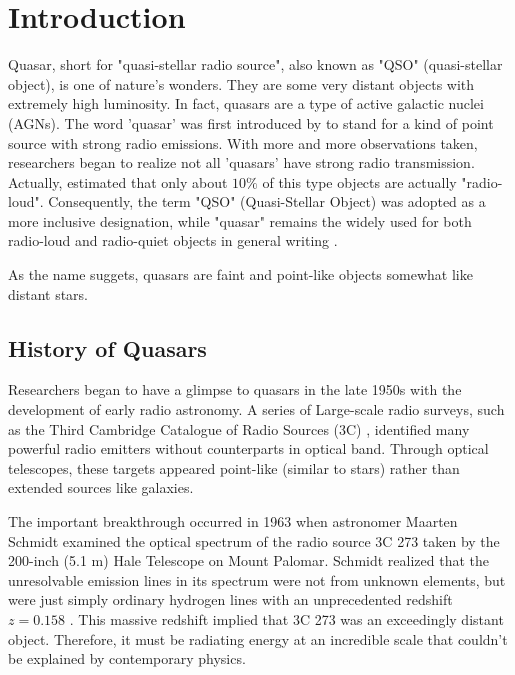 \chapter{Introduction}

Quasar, short for "quasi-stellar radio source", also known as "QSO" (quasi-stellar object), is one of nature's wonders. They are some very distant objects with extremely high luminosity. In fact, quasars are a type of active galactic nuclei (AGNs). The word 'quasar' was first introduced by \citet{chiuGravitationalCollapse1964} to stand for a kind of point source with strong radio emissions. With more and more observations taken, researchers began to realize not all 'quasars' have strong radio transmission. Actually, \citet{kellermannVLAObservationsObjects1989,ivezicOpticalRadioProperties2002} estimated that only about $10\%$ of this type objects are actually "radio-loud". Consequently, the term "QSO" (Quasi-Stellar Object) was adopted as a more inclusive designation, while "quasar" remains the widely used for both radio-loud and radio-quiet objects in general writing \citep{shieldsBriefHistoryActive1999}. 

As the name suggets, quasars are faint and point-like objects somewhat like distant stars. 

\section{History of Quasars}

Researchers began to have a glimpse to quasars in the late 1950s with the development of early radio astronomy. A series of Large-scale radio surveys, such as the Third Cambridge Catalogue of Radio Sources (3C) \citep{edgeSurveyRadioSources1959, bennettPreparationRevised3C1962}, identified many powerful radio emitters without counterparts in optical band. Through optical telescopes, these targets appeared point-like (similar to stars) rather than extended sources like galaxies.

The important breakthrough occurred in 1963 when astronomer Maarten Schmidt examined the optical spectrum of the radio source 3C 273 taken by the 200-inch (5.1 m) Hale Telescope on Mount Palomar. Schmidt realized that the unresolvable emission lines in its spectrum were not from unknown elements, but were just simply ordinary hydrogen lines with an unprecedented redshift $z = 0.158$ \citep{schmidt3C273StarLike1963}. This massive redshift implied that 3C 273 was an exceedingly distant object. Therefore, it must be radiating energy at an incredible scale that couldn't be explained by contemporary physics.

